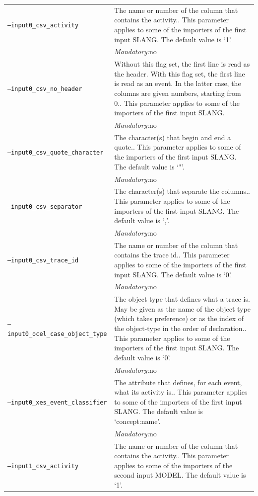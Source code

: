 {\begin{tabularx}{\linewidth}{lX}
\texttt{--input0\_csv\_activity} & The name or number of the column that contains the activity.. This parameter applies to some of the importers of the first input SLANG. The default value is `1'.\\
&\textit{Mandatory:}\quad no\\
\texttt{--input0\_csv\_no\_header} & Without this flag set, the first line is read as the header. 
    With this flag set, the first line is read as an event. In the latter case, the columns are given numbers, starting from 0.. This parameter applies to some of the importers of the first input SLANG. \\
&\textit{Mandatory:}\quad no\\
\texttt{--input0\_csv\_quote\_character} & The character(s) that begin and end a quote.. This parameter applies to some of the importers of the first input SLANG. The default value is `"'.\\
&\textit{Mandatory:}\quad no\\
\texttt{--input0\_csv\_separator} & The character(s) that separate the columns.. This parameter applies to some of the importers of the first input SLANG. The default value is `,'.\\
&\textit{Mandatory:}\quad no\\
\texttt{--input0\_csv\_trace\_id} & The name or number of the column that contains the trace id.. This parameter applies to some of the importers of the first input SLANG. The default value is `0'.\\
&\textit{Mandatory:}\quad no\\
\texttt{--input0\_ocel\_case\_object\_type} & The object type that defines what a trace is. May be given as the name of the object type (which takes preference) or as the index of the object-type in the order of declaration.. This parameter applies to some of the importers of the first input SLANG. The default value is `0'.\\
&\textit{Mandatory:}\quad no\\
\texttt{--input0\_xes\_event\_classifier} & The attribute that defines, for each event, what its activity is.. This parameter applies to some of the importers of the first input SLANG. The default value is `concept:name'.\\
&\textit{Mandatory:}\quad no\\
\texttt{--input1\_csv\_activity} & The name or number of the column that contains the activity.. This parameter applies to some of the importers of the second input MODEL. The default value is `1'.\\

\end{tabularx}}
